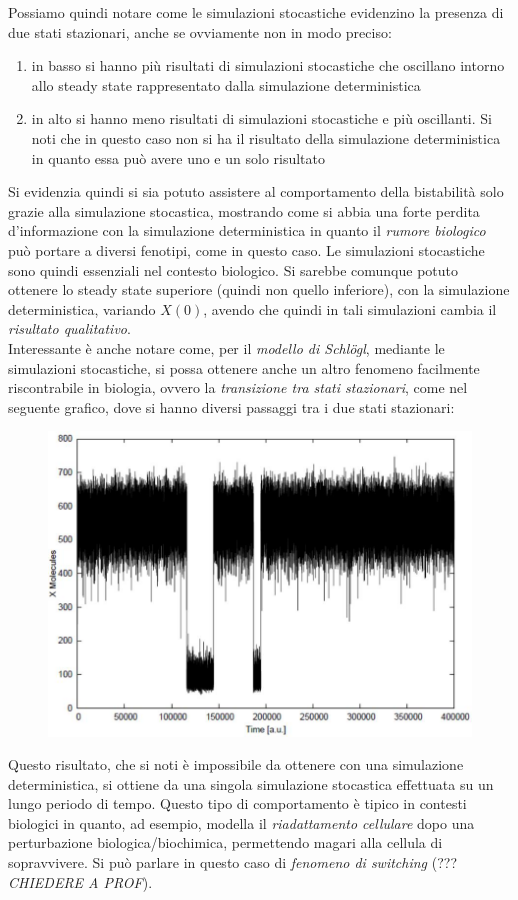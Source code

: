 \documentclass[a4paper,12pt, oneside]{book}
\begin{document}
Possiamo quindi notare come le simulazioni stocastiche evidenzino la presenza di
due stati stazionari, anche se ovviamente non in modo preciso:
\begin{enumerate}
  \item in basso si hanno più risultati di simulazioni stocastiche che oscillano
  intorno allo 
  steady state rappresentato dalla simulazione deterministica
  \item in alto si hanno meno risultati di simulazioni stocastiche e più
  oscillanti. Si noti che in questo caso non si ha il risultato della
  simulazione deterministica in quanto essa può avere uno e un solo risultato 
\end{enumerate}
Si evidenzia quindi si sia potuto assistere al comportamento della bistabilità
solo grazie alla simulazione stocastica, mostrando come si abbia una forte
perdita d'informazione con la simulazione deterministica in quanto il
\textit{rumore biologico} può portare a diversi fenotipi, come in questo
caso. Le simulazioni stocastiche sono quindi essenziali nel contesto
biologico. Si sarebbe comunque potuto ottenere lo steady state superiore (quindi
non quello inferiore), con la simulazione deterministica, variando $X(0)$,
avendo che quindi in tali simulazioni cambia il \textit{risultato
  qualitativo}.\\
Interessante è anche notare come, per il \textit{modello di Schl\"{o}gl},
mediante le simulazioni stocastiche, si possa ottenere anche un altro fenomeno
facilmente riscontrabile in biologia, ovvero la \textit{transizione tra stati
  stazionari}, come nel seguente grafico, dove si hanno diversi passaggi tra i
due stati stazionari:
\begin{figure}[H]
  \centering
  \includegraphics[scale = 0.3]{img/noiss4.jpg}
\end{figure}
Questo risultato, che si noti è impossibile da ottenere con una simulazione
deterministica, si ottiene da una singola simulazione stocastica effettuata su 
un lungo periodo di tempo. Questo tipo di comportamento è tipico in contesti
biologici in quanto, ad esempio, modella il \textit{riadattamento cellulare}
dopo una perturbazione biologica/biochimica, permettendo magari alla cellula di
sopravvivere. Si può parlare in questo caso di \textit{fenomeno di switching}
(??? \textit{CHIEDERE A PROF}). 
\end{document}
